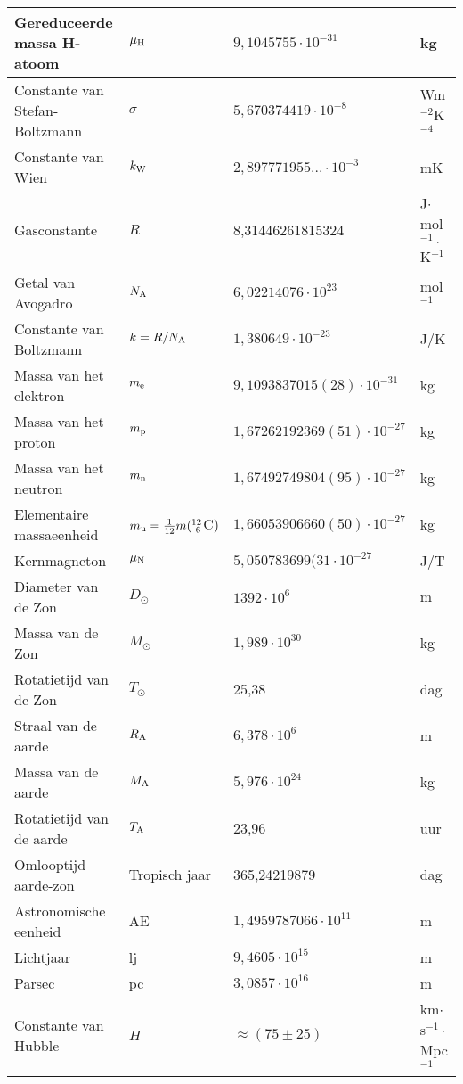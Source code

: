 \documentclass[twoside]{report}
\begin{document}
\begin{center}
\begin{tabular}{||l|lll||}
Gereduceerde massa H-atoom     &$\mu_{\rm H}$&$9,1045755\cdot10^{-31}$&kg\\
\hline
Constante van Stefan-Boltzmann &$\sigma$&$5,670374419\cdot10^{-8}$&Wm$^{-2}$K$^{-4}$\rule{0pt}{13pt}\\
Constante van Wien             &$k_{\rm W}$&$2,897771955...\cdot10^{-3}$&mK\\
\hline
Gasconstante                   &$R$&8,31446261815324&J$\cdot$mol$^{-1}\cdot$K$^{-1}$\\
Getal van Avogadro             &$N_{\rm A}$&$6,02214076\cdot10^{23}$&mol$^{-1}$\\
Constante van Boltzmann        &$k=R/N_{\rm A}$&$1,380649\cdot10^{-23}$&J/K\\
\hline
Massa van het elektron         &$m_{\rm e}$&$9,1093837015(28)\cdot10^{-31}$&kg\rule{0pt}{13pt}\\
Massa van het proton           &$m_{\rm p}$&$1,67262192369(51)\cdot10^{-27}$&kg\\
Massa van het neutron          &$m_{\rm n}$&$1,67492749804(95)\cdot10^{-27}$&kg\\
Elementaire massaeenheid       &$m_{\rm u}=\frac{1}{12}m(^{12}_{~6}$C)&$1,66053906660(50)\cdot10^{-27}$&kg\\
Kernmagneton                   &$\mu_{\rm N}$&$5,050783699(31\cdot10^{-27}$&J/T\\
\hline
Diameter van de Zon            &$D_\odot$&$1392\cdot10^6$&m\rule{0pt}{13pt}\\
Massa van de Zon               &$M_\odot$&$1,989\cdot10^{30}$&kg\\
Rotatietijd van de Zon         &$T_\odot$&25,38&dag\\
Straal van de aarde            &$R_{\rm A}$&$6,378\cdot10^6$&m\\
Massa van de aarde             &$M_{\rm A}$&$5,976\cdot10^{24}$&kg\\
Rotatietijd van de aarde       &$T_{\rm A}$&23,96&uur\\
Omlooptijd aarde-zon           &Tropisch jaar&365,24219879&dag\\
Astronomische eenheid          &AE&$1,4959787066\cdot10^{11}$&m\\
Lichtjaar                      &lj&$9,4605\cdot10^{15}$&m\\
Parsec                         &pc&$3,0857\cdot10^{16}$&m\\
Constante van Hubble           &$H$&$\approx(75\pm25)$&km$\cdot$s$^{-1}\cdot$Mpc$^{-1}$\\
\hline
\end{tabular}
\end{center}
\end{document}

